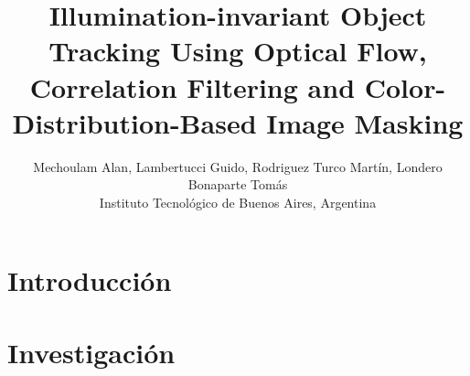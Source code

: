 

\usepackage[procnames]{listings}








\title{Illumination-invariant Object Tracking Using Optical Flow, Correlation Filtering and Color-Distribution-Based Image Masking}
\author{Mechoulam Alan, Lambertucci Guido, Rodriguez Turco Martín, Londero Bonaparte Tomás\\
\small{Instituto Tecnológico de Buenos Aires, Argentina}}

\twocolumn[
  \begin{@twocolumnfalse}
    \maketitle
    \begin{abstract}
		
	\end{abstract}
  \end{@twocolumnfalse}
  ]





%



\section{Introducción}

	
\section{Investigación}


